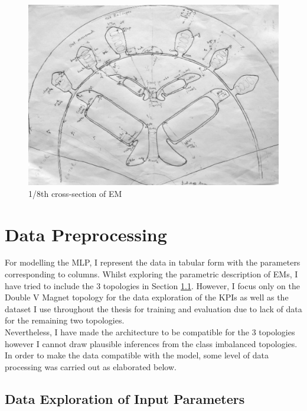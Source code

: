 \documentclass{report} %
\begin{document}
\begin{figure}[H]
    \centering
    \includegraphics[width=1\textwidth]{./ReportImages/EMCrosssectionFiltered.png} 
    \caption{1/8th cross-section of \ac{EM}}
    \label{fig:1/8 Motor Crossection}
\end{figure}

\section{Data Preprocessing}\label{sec:Data Preprocessing for MLP}
For modelling the \ac{MLP}, I represent the data in tabular form with the parameters corresponding to columns. 
Whilst exploring the parametric description of \ac{EM}s, I have tried to include the 3 topologies in Section \ref{subsec:Deep Dive into Input Parameters}.
However, I focus only on the Double V Magnet topology for the data exploration of the \ac{KPI}s as well as the dataset I use throughout the thesis for training and 
evaluation due to lack of data for the remaining two topologies. \\
Nevertheless, I have made the architecture to be compatible for the 3 topologies however I cannot draw plausible inferences from the class imbalanced topologies. \\
In order to make the data compatible with the model, some level of data processing was carried out as elaborated below.

\subsection{Data Exploration of Input Parameters}\label{subsec:Deep Dive into Input Parameters}
\end{document}
